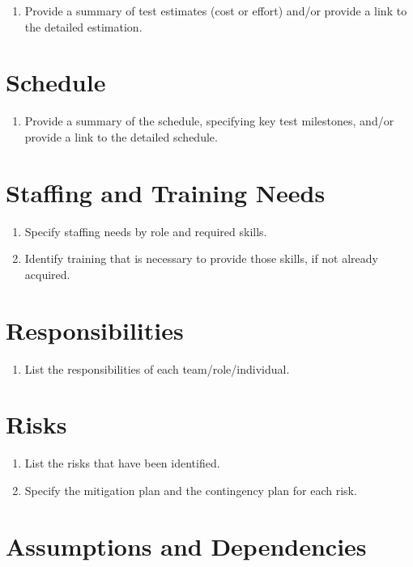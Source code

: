 \begin{enumerate}
	\item Provide a summary of test estimates (cost or effort) and/or provide a link to the detailed estimation.
\end{enumerate}

\section{Schedule}

\begin{enumerate}
	\item Provide a summary of the schedule, specifying key test milestones, and/or provide a link to the detailed schedule.
\end{enumerate}

\section{Staffing and Training Needs}

\begin{enumerate}
	\item Specify staffing needs by role and required skills.
	\item Identify training that is necessary to provide those skills, if not already acquired.
\end{enumerate}

\section{Responsibilities}

\begin{enumerate}
	\item List the responsibilities of each team/role/individual.
\end{enumerate}

\section{Risks}

\begin{enumerate}
	\item List the risks that have been identified.
	\item Specify the mitigation plan and the contingency plan for each risk.
\end{enumerate}

\section{Assumptions and Dependencies}

